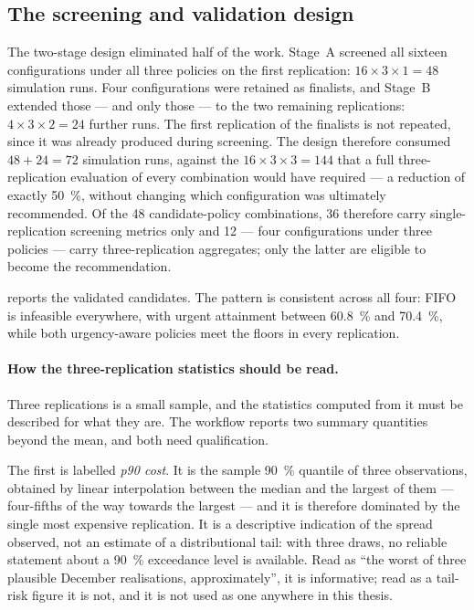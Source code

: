 \subsection{The screening and validation design}

The two-stage design eliminated half of the work. Stage~A screened all sixteen configurations
under all three policies on the first replication: \(16 \times 3 \times 1 = 48\) simulation
runs. Four configurations were retained as finalists, and Stage~B extended those --- and only
those --- to the two remaining replications: \(4 \times 3 \times 2 = 24\) further runs. The
first replication of the finalists is not repeated, since it was already produced during
screening. The design therefore consumed \(48 + 24 = 72\) simulation runs, against the
\(16 \times 3 \times 3 = 144\) that a full three-replication evaluation of every combination
would have required --- a reduction of exactly \SI{50}{\percent}, without changing which
configuration was ultimately recommended. Of the 48 candidate-policy combinations, 36 therefore
carry single-replication screening metrics only and 12 --- four configurations under three
policies --- carry three-replication aggregates; only the latter are eligible to become the
recommendation.

 reports the validated candidates. The pattern is consistent across
all four: FIFO is infeasible everywhere, with urgent attainment between \SI{60.8}{\percent} and
\SI{70.4}{\percent}, while both urgency-aware policies meet the floors in every replication.

\paragraph{How the three-replication statistics should be read.} Three replications is a small
sample, and the statistics computed from it must be described for what they are. The workflow
reports two summary quantities beyond the mean, and both need qualification.

The first is labelled \emph{p90 cost}. It is the sample \SI{90}{\percent} quantile of three
observations, obtained by linear interpolation between the median and the largest of them ---
four-fifths of the way towards the largest --- and it is therefore dominated by the single most
expensive replication. It is a descriptive indication of
the spread observed, not an estimate of a distributional tail: with three draws, no reliable
statement about a \SI{90}{\percent} exceedance level is available. Read as ``the worst of three
plausible December realisations, approximately'', it is informative; read as a tail-risk figure
it is not, and it is not used as one anywhere in this thesis.

